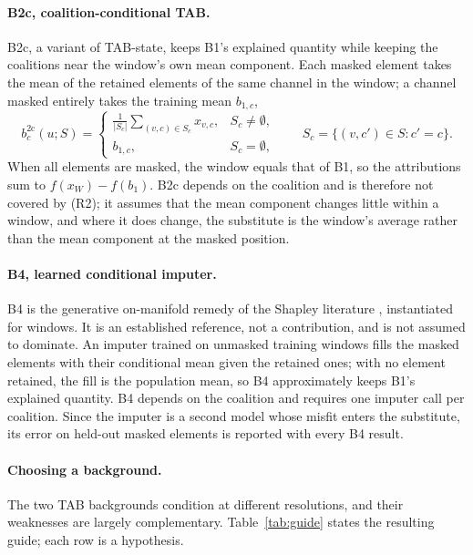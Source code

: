 \documentclass{article}
\begin{document}
\paragraph{B2c, coalition-conditional TAB.} B2c, a variant of TAB-state, keeps B1's explained quantity while keeping the coalitions near the window's own mean component. Each masked element takes the mean of the retained elements of the same channel in the window; a channel masked entirely takes the training mean $b_{1,c}$,
\begin{equation}\label{eq:b2c}
b^{\mathrm{2c}}_c(u;S) = \begin{cases}
\frac{1}{|S_c|}\sum_{(v,c)\in S_c} x_{v,c}, & S_c\neq\emptyset,\\
b_{1,c}, & S_c=\emptyset,
\end{cases}\qquad S_c = \{(v,c')\in S : c'=c\}.
\end{equation}
When all elements are masked, the window equals that of B1, so the attributions sum to $f(x_W)-f(b_1)$. B2c depends on the coalition and is therefore not covered by (R2); it assumes that the mean component changes little within a window, and where it does change, the substitute is the window's average rather than the mean component at the masked position.

\paragraph{B4, learned conditional imputer.} B4 is the generative on-manifold remedy of the Shapley literature \citep{frye2021shapley}, instantiated for windows. It is an established reference, not a contribution, and is not assumed to dominate. An imputer trained on unmasked training windows fills the masked elements with their conditional mean given the retained ones; with no element retained, the fill is the population mean, so B4 approximately keeps B1's explained quantity. B4 depends on the coalition and requires one imputer call per coalition. Since the imputer is a second model whose misfit enters the substitute, its error on held-out masked elements is reported with every B4 result.

\paragraph{Choosing a background.} The two TAB backgrounds condition at different resolutions, and their weaknesses are largely complementary. Table~\ref{tab:guide} states the resulting guide; each row is a hypothesis.
\end{document}
